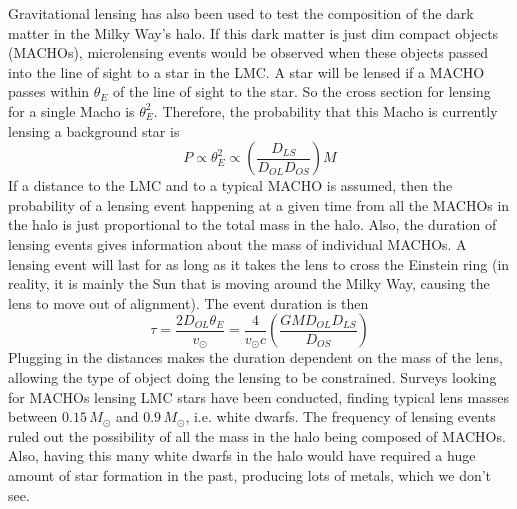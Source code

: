 Gravitational lensing has also been used to test the composition of the 
dark matter in the Milky Way's halo.  If this dark matter is just dim compact 
objects (MACHOs), microlensing events would be observed when these objects 
passed into the line of sight to a star in the LMC.  A star will be lensed 
if a MACHO passes within $\theta_E$ of the line of sight to the star.  
So the cross section for lensing for a single Macho is $\theta_E^2$.  
Therefore, the probability that this Macho is currently lensing a background 
star is 
\begin{equation}
P\propto\theta_E^2\propto\left(\frac{D_{LS}}{D_{OL}D_{OS}}\right)M
\end{equation}
If a distance to the LMC and to a typical MACHO is assumed, then the 
probability of a lensing event happening at a given time from all the MACHOs 
in the halo is just proportional to the total mass in the halo.  Also, the 
duration of lensing events gives information about the mass of individual 
MACHOs.  A lensing event will last for as long as it takes the lens to 
cross the Einstein ring (in reality, it is mainly the Sun that is moving around 
the Milky Way, causing the lens to move out of alignment).  The event duration 
is then
\begin{equation}
\tau=\frac{2D_{OL}\theta_E}{v_{\odot}}=\frac{4}{v_{\odot}c}\left(\frac{GMD_{OL}D_{LS}}{D_{OS}}\right)
\end{equation}
Plugging in the distances makes the duration dependent on the mass of the 
lens, allowing the type of object doing the lensing to be constrained.  
Surveys looking for MACHOs lensing LMC stars have been conducted, finding 
typical lens masses between $0.15\,M_{\odot}$ and $0.9\,M_{\odot}$, i.e. white 
dwarfs.  The frequency of lensing events ruled out the possibility of all 
the mass in the halo being composed of MACHOs.  Also, having this many 
white dwarfs in the halo would have required a huge amount of star formation 
in the past, producing lots of metals, which we don't see.  

